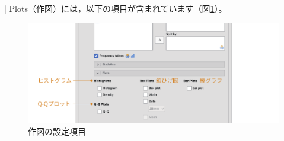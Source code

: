 \documentclass[
  12pt,
  a5jpaper,
  lualatex, ja=standard]{bxjsbook}
\begin{document}
\colorbox{bar}{\textcolor{gmoji2}{| Plots}}（作図）には，以下の項目が含まれています（図\ref{fig:Exploration-descriptives-plots-setting}）。

\begin{figure}[!ht]

{\centering \includegraphics[width=1\linewidth]{images/exploration/Exploration-descriptives-plots-setting} 

}

\caption{作図の設定項目}\label{fig:Exploration-descriptives-plots-setting}
\end{figure}
\end{document}
